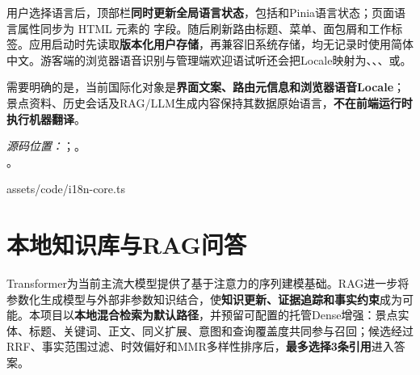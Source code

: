 用户选择语言后，顶部栏\textbf{同时更新全局语言状态}，包括和Pinia语言状态；页面语言属性同步为 HTML 元素的  字段。随后刷新路由标题、菜单、面包屑和工作标签。应用启动时先读取\textbf{版本化用户存储}，再兼容旧系统存储，均无记录时使用简体中文。游客端的浏览器语音识别与管理端欢迎语试听还会把Locale映射为、、、或。

需要明确的是，当前国际化对象是\textbf{界面文案、路由元信息和浏览器语音Locale}；景点资料、历史会话及RAG/LLM生成内容保持其数据原始语言，\textbf{不在前端运行时执行机器翻译}。

\newpage
\noindent\textit{源码位置：}；。\\
。


  {assets/code/i18n-core.ts}

\newpage
\section{本地知识库与RAG问答}

Transformer为当前主流大模型提供了基于注意力的序列建模基础。RAG进一步将参数化生成模型与外部非参数知识结合，使\textbf{知识更新、证据追踪和事实约束}成为可能。本项目以\textbf{本地混合检索为默认路径}，并预留可配置的托管Dense增强：景点实体、标题、关键词、正文、同义扩展、意图和查询覆盖度共同参与召回；候选经过RRF、事实范围过滤、时效偏好和MMR多样性排序后，\textbf{最多选择3条引用}进入答案。

